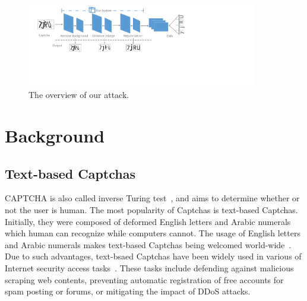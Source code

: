 \begin{figure}[!t]
  \centering
  \includegraphics[width=0.9\textwidth]{fig/overview.pdf}
  \caption{The overview of our attack.}
  \label{fig:overview}
\end{figure}

\section{Background}

\subsection{Text-based Captchas}

CAPTCHA is also called inverse Turing test~\cite{Naor1996Verification}, and aims to determine whether or not the user is human. The most popularity of Captchas is text-based Captchas. Initially, they were composed of deformed English letters and Arabic numerals which human can recognize while computers cannot. The usage of English letters and Arabic numerals makes text-based Captchas being welcomed world-wide~\cite{Chellapilla2005Building,Chellapilla2005Computers}. Due to such advantages, text-bsaed Captchas have been widely used in various of Internet security access tasks~\cite{Von2004Telling}. These tasks include defending against malicious scraping web contents, preventing automatic registration of free accounts for spam posting or forums, or mitigating the impact of DDoS attacks.

